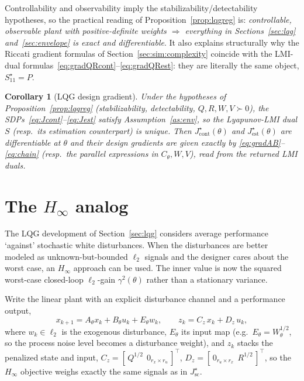 \documentclass[twocolumn,amsthm]{autart}
\newtheorem{corollary}{Corollary}
\begin{document}
Controllability and observability imply the stabilizability/detectability
hypotheses, so the practical reading of Proposition~\ref{prop:lqgreg} is:
\emph{controllable, observable plant with positive-definite weights $\Rightarrow$
everything in Sections~\ref{sec:lqg} and~\ref{sec:envelope} is exact and
differentiable}. It also explains structurally why the Riccati gradient formulas
of Section~\ref{sec:sim:complexity} coincide with the LMI-dual
formulas~\eqref{eq:gradQRcont}--\eqref{eq:gradQRest}: they are literally the same
object, $S_{11}^\star=P$.

\begin{corollary}[LQG design gradient]\label{cor:lqg}
Under the hypotheses of Proposition~\ref{prop:lqgreg} (stabilizability,
detectability, $Q,R,W,V\succ0$), the SDPs~\eqref{eq:Jcont}--\eqref{eq:Jest}
satisfy Assumption~\ref{as:env}, so the Lyapunov-LMI dual $S$ (resp.\ its
estimation counterpart) is unique. Then $J_{\mathrm{cont}}^\star(\theta)$ and
$J_{\mathrm{est}}^\star(\theta)$ are differentiable at $\theta$ and their design
gradients are given exactly by \eqref{eq:gradAB}--\eqref{eq:chain} (resp.\ the
parallel expressions in $C_\theta, W, V$), read from the returned LMI duals.
\end{corollary}


\section{The $H_\infty$ analog}\label{sec:hinf}

The LQG development of Section~\ref{sec:lqg} considers average performance
`against' stochastic white disturbances. When the disturbances are better modeled as
unknown-but-bounded $\ell_2$ signals and the designer cares about the
worst case, an $H_\infty$ approach can be used. The inner value is now the
squared worst-case closed-loop $\ell_2$-gain $\gamma^2(\theta)$ rather than a
stationary variance.

Write the linear plant with an explicit disturbance channel and a performance
output,
\begin{equation}\label{eq:hinf_plant}
x_{k+1} = A_\theta x_k + B_\theta u_k + E_\theta w_k,\qquad
z_k = C_{z}\,x_k + D_{z}\,u_k,
\end{equation}
where $w_k\in\ell_2$ is the exogenous disturbance, $E_\theta$ its input map
(e.g.\ $E_\theta = W_\theta^{1/2}$, so the process noise level becomes a disturbance weight), and $z_k$ stacks the penalized
state and input, $C_z = [\,Q^{1/2}\;\,0_{r_x \times r_u}\,]^\top$, $D_z = [\,0_{r_u \times r_x}\;\,R^{1/2}\,]^\top$, so the
$H_\infty$ objective weighs exactly the same signals as in $J_{\mathrm{sc}}^\star$.
\end{document}
